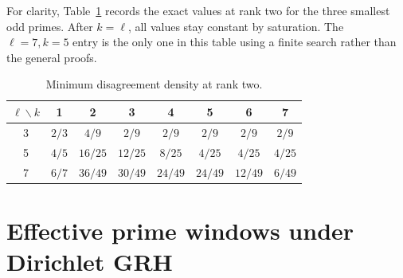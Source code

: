 \documentclass[11pt]{article}
\theoremstyle{remark}\newtheorem{remark}[theorem]{Remark}
\begin{document}
For clarity, Table~\ref{tab:values} records the exact values at rank two for the three smallest odd primes. After $k=\ell$, all values stay constant by saturation. The $\ell=7,k=5$ entry is the only one in this table using a finite search rather than the general proofs.
\begin{table}[ht]
\centering
\caption{Minimum disagreement density at rank two.}\label{tab:values}
\begin{tabular}{c*{7}{c}}
\toprule
$\ell\backslash k$ & 1&2&3&4&5&6&7\\
\midrule
3&$2/3$&$4/9$&$2/9$&$2/9$&$2/9$&$2/9$&$2/9$\\
5&$4/5$&$16/25$&$12/25$&$8/25$&$4/25$&$4/25$&$4/25$\\
7&$6/7$&$36/49$&$30/49$&$24/49$&$24/49$&$12/49$&$6/49$\\
\bottomrule
\end{tabular}
\end{table}

\section{Effective prime windows under Dirichlet GRH}\label{sec:effective}
\end{document}
